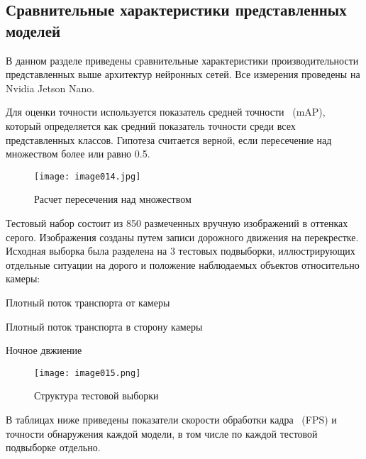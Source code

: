 \subsection{Сравнительные характеристики представленных моделей}

В данном разделе приведены сравнительные характеристики производительности представленных выше архитектур нейронных сетей. Все измерения проведены на Nvidia Jetson Nano.

Для оценки точности используется показатель средней точности ~(mAP), который определяется как средний показатель точности среди всех представленных классов. Гипотеза считается верной, если пересечение над множеством более или равно 0.5.

\begin{figure}[htbp]
\centering
\texttt{[image: image014.jpg]}
\caption{Расчет пересечения над множеством}%
\label{fig:how-to-do-research}
\end{figure}

Тестовый набор состоит из 850 размеченных вручную изображений в оттенках серого. Изображения созданы путем записи дорожного движения на перекрестке. Исходная выборка была разделена на 3 тестовых подвыборки, иллюстрирующих отдельные ситуации на дорого и положение наблюдаемых объектов относительно камеры:
%
\begin{itemize*}
  \item Плотный поток транспорта от камеры
  \item Плотный поток транспорта в сторону камеры
  \item Ночное двжиение  
\end{itemize*}
%

\begin{figure}[htbp]
\centering
\texttt{[image: image015.png]}
\caption{Структура тестовой выборки}%
\label{fig:how-to-do-research}
\end{figure}

В таблицах ниже приведены показатели скорости обработки кадра ~(FPS) и точности обнаружения каждой модели, в том числе по каждой тестовой подвыборке отдельно.

